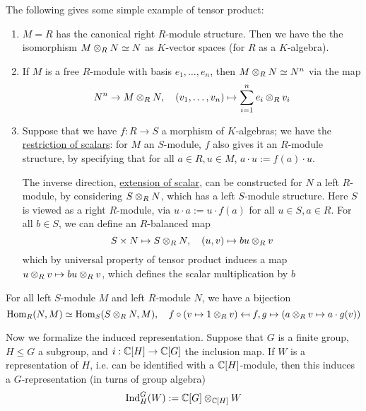 \documentclass{article}
\begin{document}
\begin{example}
    The following gives some simple example of tensor product:
    \begin{enumerate}[label=\arabic*)]
        \item $M = R$ has the canonical right $R$-module structure. Then we have the the isomorphism $M \otimes_R N \simeq N$ as $K$-vector spaces (for $R$ as a $K$-algebra).
        \item If $M$ is a free $R$-module with basis $e_1, \dots, e_n$, then $M \otimes_R N \simeq N^n$ via the map
        \[
            N^n \to M \otimes_R N, \quad (v_1, \dots, v_n) \mapsto \sum_{i = 1}^n e_i \otimes_R v_i
        \]
        \item Suppose that we have $f: R \to S$ a morphism of $K$-algebras; we have the \underline{restriction of scalars}: for $M$ an $S$-module, $f$ also gives it an $R$-module structure, by specifying that for all $a \in R, u \in M$, $a \cdot u := f(a) \cdot u$. 
        
        The inverse direction, \underline{extension of scalar}, can be constructed for $N$ a left $R$-module, by considering $S \otimes_R N$, which has a left $S$-module structure. Here $S$ is viewed as a right $R$-module, via $u \cdot a := u \cdot f(a)$ for all $u \in S, a \in R$. For all $b \in S$, we can define an $R$-balanced map
        \[
            S \times N \mapsto S \otimes_R N, \quad (u, v) \mapsto bu \otimes_R v
        \]
        which by universal property of tensor product induces a map $u \otimes_R v \mapsto bu \otimes_R v$, which defines the scalar multiplication by $b$
    \end{enumerate}
\end{example}

\begin{proposition}\label{prop: Universal Property of Extension of Scalar}
    For all left $S$-module $M$ and left $R$-module $N$, we have a bijection
    \[
        \mathrm{Hom}_R(N, M) \simeq \mathrm{Hom}_S(S \otimes_R N, M), \quad f \circ (v \mapsto 1 \otimes_R v) \mapsfrom f, g \mapsto (a \otimes_R v \mapsto a \cdot g(v))
    \]
\end{proposition}

\textstart
Now we formalize the induced representation. Suppose that $G$ is a finite group, $H \leq G$ a subgroup, and $i: \mathbb{C}[H] \to \mathbb{C}[G]$ the inclusion map. If $W$ is a representation of $H$, i.e. can be identified with a $\mathbb{C}[H]$-module, then this induces a $G$-representation (in turns of group algebra)
\[
    \mathrm{Ind}_H^G (W) := \mathbb{C}[G] \otimes_{\mathbb{C}[H]} W
\]
\end{document}
